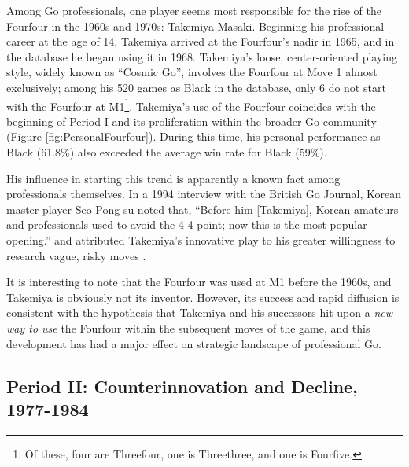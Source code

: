 Among Go professionals, one player seems most responsible for the rise of the Fourfour in the 1960s and 1970s: Takemiya Masaki.  Beginning his professional career at the age of 14, Takemiya arrived at the Fourfour's nadir in 1965, and in the database he began using it in 1968.  Takemiya's loose, center-oriented playing style, widely known as ``Cosmic Go'', involves the Fourfour at Move 1 almost exclusively; among his 520 games as Black in the database, only 6 do not start with the Fourfour at M1\footnote{Of these, four are Threefour, one is Threethree, and one is Fourfive.}.  Takemiya's use of the Fourfour coincides with the beginning of Period I and its proliferation within the broader Go community (Figure \ref{fig:PersonalFourfour}).  During this time, his personal performance as Black (61.8\%) also exceeded the average win rate for Black (59\%).  

His influence in starting this trend is apparently a known fact among professionals themselves.  In a 1994 interview with the British Go Journal, Korean master player Seo Pong-su noted that, ``Before him [Takemiya], Korean amateurs and professionals used to avoid the 4-4 point; now this is the most popular opening.'' and attributed Takemiya's innovative play to his greater willingness to research vague, risky moves \citep{Finch1994}.	    

It is interesting to note that the Fourfour was used at M1 before the 1960s, and Takemiya is obviously not its inventor.  However, its success and rapid diffusion is consistent with the hypothesis that Takemiya and his successors hit upon a \textit{new way to use} the Fourfour within the subsequent moves of the game, and this development has had a major effect on strategic landscape of professional Go.

\subsection{Period II: Counterinnovation and Decline, 1977-1984}

